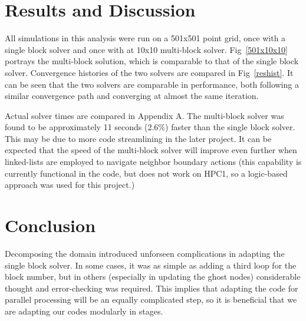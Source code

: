 \documentclass[twocolumn,10pt]{asme2ej}
\begin{document}
\section{Results and Discussion}

All simulations in this analysis were run on a 501x501 point grid, once with a single block solver and once with at 10x10 multi-block solver.  Fig~\ref{501x10x10} portrays the multi-block solution, which is comparable to that of the single block solver.  Convergence histories of the two solvers are compared in Fig~\ref{reshist}.  It can be seen that the two solvers are comparable in performance, both following a similar convergence path and converging at almost the same iteration.

Actual solver times are compared in Appendix A.  The multi-block solver was found to be approximately 11 seconds (2.6\%) faster than the single block solver.  This may be due to more code streamlining in the later project.  It can be expected that the speed of the multi-block solver will improve even further when linked-lists are employed to navigate neighbor boundary actions (this capability is currently functional in the code, but does not work on HPC1, so a logic-based approach was used for this project.)





\section{Conclusion}

Decomposing the domain introduced unforseen complications in adapting the single block solver.  In some cases, it was as simple as adding a third loop for the block number, but in others (especially in updating the ghost nodes) considerable thought and error-checking was required.  This implies that adapting the code for parallel processing will be an equally complicated step, so it is beneficial that we are adapting our codes modularly in stages.

\end{document}
